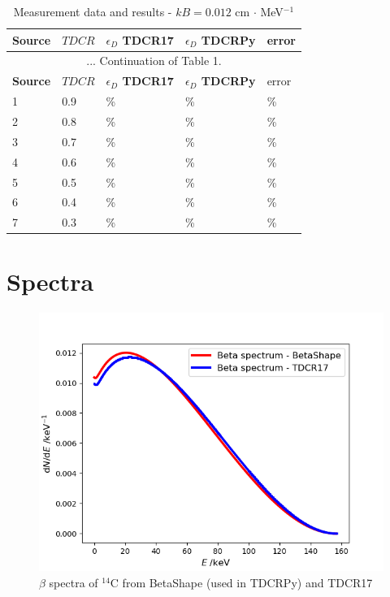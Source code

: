 \documentclass[12pt]{iopart}
\begin{document}
\begingroup
\footnotesize
\begin{longtable}[l]{| p{} | p{} |p{} |p{} |p{} |} 
\caption{Measurement data and results - $kB = 0.012$ cm $\cdot$ MeV$^{-1}$}
\label{Table1} \\ 
\hline
\textbf{Source} & \textbf{$TDCR$} & \textbf{$\epsilon_{D}$ TDCR17} & \textbf{$\epsilon_{D}$ TDCRPy} & error \\ 
\endfirsthead
\multicolumn{5}{c}{... Continuation of Table 1.}\\ 
\hline
 \textbf{Source} & \textbf{$TDCR$} & \textbf{$\epsilon_{D}$ TDCR17} & \textbf{$\epsilon_{D}$ TDCRPy} & error \\   \hline 
\endhead
\hline
 1 & 0.9   &    \% &    \% &  \% \\
 2 & 0.8   &    \% &    \% &  \% \\
 3 & 0.7   &    \% &    \% &  \% \\
 4 & 0.6   &    \% &    \% &  \% \\
 5 & 0.5   &    \% &    \% &  \% \\
 6 & 0.4   &    \% &    \% &  \% \\
 7 & 0.3   &    \% &    \% &  \% \\
\hline
\end{longtable} 
\endgroup

\pagebreak
\section{Spectra}

\begin{figure}[h!]
\centering
\includegraphics[scale=0.4]{../decayData/spectra/BetaSpectrum_C-14.png}
\caption{$\beta$ spectra of $^{14}$C from BetaShape (used in TDCRPy) and TDCR17}
\label{fig:C-14}
\end{figure}
\end{document}
